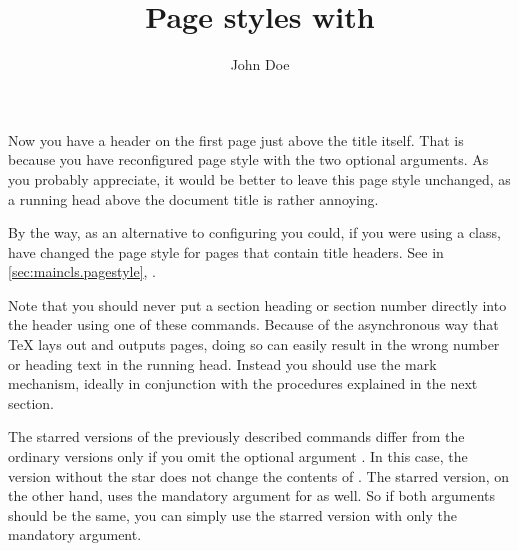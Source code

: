 \begin{Example}
\begin{lstcode}
  \title{Page styles with \KOMAScript}
  \author{John Doe}
  \maketitle
  
\end{lstcode}
  Now you have a header on the first page just above the title itself.
  That is because you have reconfigured page style
   with the two optional
  arguments. As you probably appreciate, it would be better to leave this page
  style unchanged, as a running head above the document title is rather
  annoying.
  
  By the way, as an alternative to configuring
   you could, if you were
  using a \KOMAScript{} class, have changed the page style for pages that
  contain title headers. See %
   in \autoref{sec:maincls.pagestyle},
  .
\end{Example}

Note that you should never put a section
heading or section number directly into the header using one of these
commands. Because of the asynchronous way that \TeX{} lays out and outputs
pages, doing so can easily result in the wrong number or heading text in the
running head. Instead you should use the mark mechanism, ideally in
conjunction with the procedures explained in the next section.%
\EndIndexGroup

\begin{Declaration}
\end{Declaration}
The starred versions of the
previously described commands differ from the ordinary versions only if you
omit the optional argument . In this case,
the version without the star does not change the contents of
. The starred version, on the
other hand, uses the mandatory argument 
for  as well. So if both
arguments should be the same, you can simply use the starred version with only
the mandatory argument.%

